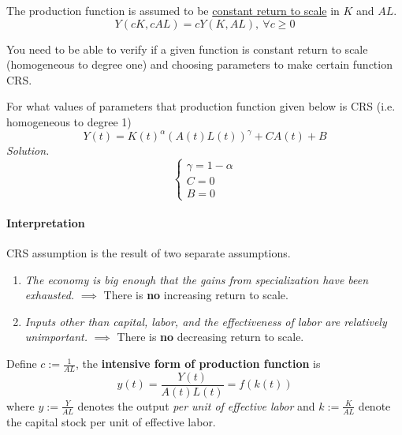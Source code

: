 \documentclass[11pt]{article}
\begin{document}
            \begin{assumption} The production function is assumed to be \ul{constant return to scale} in $K$ and $AL$.
	            \begin{equation}
	            		Y(cK, cAL) = cY(K, AL),\ \forall c \geq 0
	            \end{equation}
	           
	        \begin{remark}
	        		You need to be able to verify if a given function is constant return to scale (homogeneous to degree one) and choosing parameters to make certain function CRS.
	        \end{remark}
	        
	        \begin{example}
	        		For what values of parameters that production function given below is CRS (i.e. homogeneous to degree 1)
	        		\begin{equation}
	        			Y(t) = K(t)^\alpha (A(t)L(t))^\gamma + C A(t) + B
	        		\end{equation}
	        		\emph{Solution.}
	        		\[
	        			\begin{cases}
	        				\gamma = 1 - \alpha \\
	        				C = 0 \\
	        				B = 0
	        			\end{cases}
	        		\]
	        \end{example}
	            
           	\paragraph{Interpretation} CRS assumption is the result of two separate assumptions.
           	\begin{enumerate}
           		\item \emph{The economy is big enough that the gains from specialization have been exhausted.} $\implies$ There is \textbf{no} increasing return to scale.
           		\item \emph{Inputs other than capital, labor, and the effectiveness of labor are relatively unimportant.} $\implies$ There is \textbf{no} decreasing return to scale.
           	\end{enumerate}
            \end{assumption}
            
            \begin{definition}
                Define $c := \frac{1}{AL}$, the \textbf{intensive form of production function} is
                \begin{equation}
                    y(t) = \frac{Y(t)}{A(t)L(t)} = f(k(t))
                \end{equation}
                where $y := \frac{Y}{AL}$ denotes the output \emph{per unit of effective labor} and $k := \frac{K}{AL}$ denote the capital stock per unit of effective labor.
            \end{definition}
	
\end{document}
